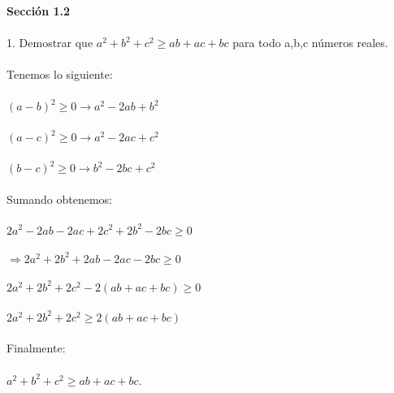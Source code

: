 \documentclass[12pt,a4paper,scrartcl]{article}
\begin{document}
\newpage
\textbf{Secci\'on 1.2}\\
\\1. Demostrar que $a^2+b^2+c^2\geq ab+ac+bc$ para todo a,b,c n\'umeros reales.\\
\\Tenemos lo siguiente:\\
\\$ (a-b)^2 \geq 0 \rightarrow a^2-2ab+b^2$\\
\\$ (a-c)^2 \geq 0 \rightarrow a^2-2ac+c^2$\\
\\$ (b-c)^2 \geq 0 \rightarrow b^2-2bc+c^2$\\
\\Sumando obtenemos:\\
\\ $2a^2-2ab-2ac+2c^2+2b^2-2bc \geq 0$\\
\\$\Rightarrow 2a^2+2b^2+2ab-2ac-2bc \geq 0 $\\
\\$ 2a^2+2b^2+2c^2-2(ab+ac+bc) \geq 0 $\\
\\$ 2a^2+2b^2+2c^2 \geq 2(ab+ac+bc)$\\
\\ Finalmente:\\
\\$ a^2+b^2+c^2 \geq ab+ac+bc$.



  
\end{document}
